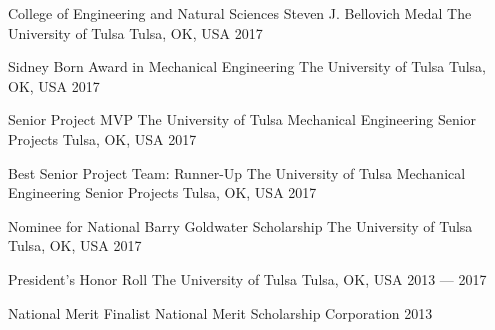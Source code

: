 \begin{cvhonors}

  \cvhonor
    {College of Engineering and Natural Sciences Steven J. Bellovich Medal} %
    {The University of Tulsa} %
    {Tulsa, OK, USA} %
    {2017} %

  \cvhonor
    {Sidney Born Award in Mechanical Engineering} %
    {The University of Tulsa} %
    {Tulsa, OK, USA} %
    {2017} %

  \cvhonor
    {Senior Project MVP} %
    {The University of Tulsa Mechanical Engineering Senior Projects} %
    {Tulsa, OK, USA} %
    {2017} %

  \cvhonor
    {Best Senior Project Team: Runner-Up} %
    {The University of Tulsa Mechanical Engineering Senior Projects} %
    {Tulsa, OK, USA} %
    {2017} %

  \cvhonor
    {Nominee for National Barry Goldwater Scholarship} %
    {The University of Tulsa} %
    {Tulsa, OK, USA} %
    {2017} %
    
\cvhonor
	{President's Honor Roll} %
	{The University of Tulsa} %
	{Tulsa, OK, USA} %
	{2013 --- 2017} %
 
\cvhonor
	{National Merit Finalist} %
	{National Merit Scholarship Corporation} %
	{} %
	{2013} %

\end{cvhonors}
